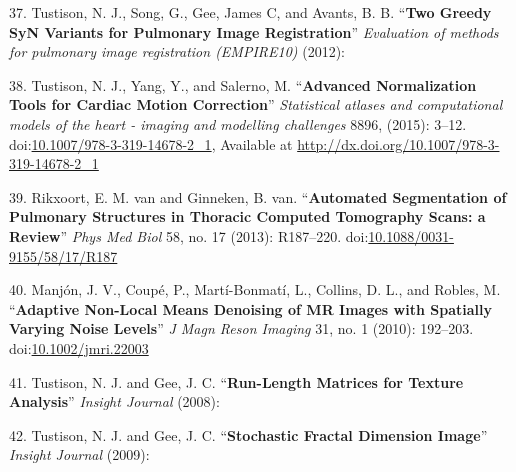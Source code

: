 \documentclass[11pt,]{article}
\begin{document}
37. Tustison, N. J., Song, G., Gee, James C, and Avants, B. B.
``\textbf{Two Greedy SyN Variants for Pulmonary Image Registration}''
\emph{Evaluation of methods for pulmonary image registration (EMPIRE10)}
(2012):

38. Tustison, N. J., Yang, Y., and Salerno, M. ``\textbf{Advanced
Normalization Tools for Cardiac Motion Correction}'' \emph{Statistical
atlases and computational models of the heart - imaging and modelling
challenges} 8896, (2015): 3--12.
doi:\href{http://dx.doi.org/10.1007/978-3-319-14678-2_1}{10.1007/978-3-319-14678-2\_1},
Available at \url{http://dx.doi.org/10.1007/978-3-319-14678-2_1}

39. Rikxoort, E. M. van and Ginneken, B. van. ``\textbf{Automated
Segmentation of Pulmonary Structures in Thoracic Computed Tomography
Scans: a Review}'' \emph{Phys Med Biol} 58, no. 17 (2013): R187--220.
doi:\href{http://dx.doi.org/10.1088/0031-9155/58/17/R187}{10.1088/0031-9155/58/17/R187}

40. Manj{ó}n, J. V., Coup{é}, P., Mart{í}-Bonmat{í}, L., Collins, D. L.,
and Robles, M. ``\textbf{Adaptive Non-Local Means Denoising of MR Images
with Spatially Varying Noise Levels}'' \emph{J Magn Reson Imaging} 31,
no. 1 (2010): 192--203.
doi:\href{http://dx.doi.org/10.1002/jmri.22003}{10.1002/jmri.22003}

41. Tustison, N. J. and Gee, J. C. ``\textbf{Run-Length Matrices for
Texture Analysis}'' \emph{Insight Journal} (2008):

42. Tustison, N. J. and Gee, J. C. ``\textbf{Stochastic Fractal
Dimension Image}'' \emph{Insight Journal} (2009):
\end{document}
